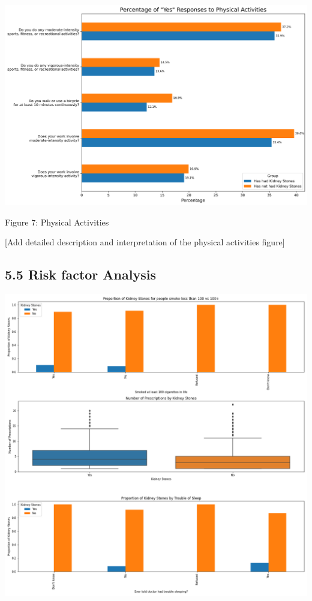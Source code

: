 \documentclass[
]{article}
\begin{document}
\includegraphics{../figures/physical_activities.png}

Figure 7: Physical Activities

{[}Add detailed description and interpretation of the physical
activities figure{]}

\hypertarget{risk-factor-analysis}{%
\subsection{5.5 Risk factor Analysis}\label{risk-factor-analysis}}

\includegraphics{../figures/Risk_Factor_Analysis.png}
\end{document}
